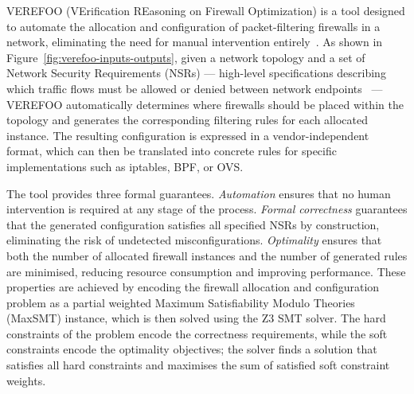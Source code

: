
VEREFOO (VErification REasoning on Firewall Optimization) is a tool designed to automate the allocation and configuration of packet-filtering firewalls in a network, eliminating the need for manual intervention entirely~\cite{verefoo}. As shown in Figure~\ref{fig:verefoo-inputs-outputs}, given a network topology and a set of Network Security Requirements (NSRs) --- high-level specifications describing which traffic flows must be allowed or denied between network endpoints~\cite{twofold} --- VEREFOO automatically determines where firewalls should be placed within the topology and generates the corresponding filtering rules for each allocated instance. The resulting configuration is expressed in a vendor-independent format, which can then be translated into concrete rules for specific implementations such as iptables, BPF, or OVS.

The tool provides three formal guarantees. \textit{Automation} ensures that no human intervention is required at any stage of the process. \textit{Formal correctness} guarantees that the generated configuration satisfies all specified NSRs by construction, eliminating the risk of undetected misconfigurations. \textit{Optimality} ensures that both the number of allocated firewall instances and the number of generated rules are minimised, reducing resource consumption and improving performance. These properties are achieved by encoding the firewall allocation and configuration problem as a partial weighted Maximum Satisfiability Modulo Theories (MaxSMT) instance, which is then solved using the Z3 SMT solver. The hard constraints of the problem encode the correctness requirements, while the soft constraints encode the optimality objectives; the solver finds a solution that satisfies all hard constraints and maximises the sum of satisfied soft constraint weights.

